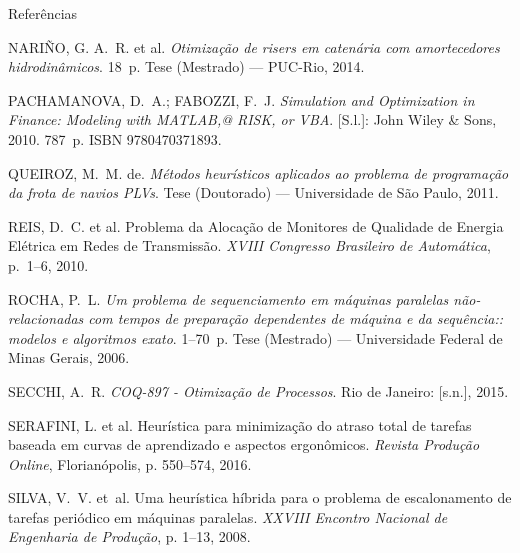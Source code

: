 \documentclass[]{beamer}
\begin{document}
\begin{frame}[allowframebreaks]{Referências}
\begin{thebibliography}{9}
		{NARI{\~{N}}O, G. A.~R. et al.
		\emph{{Otimiza{\c{c}}{\~{a}}o de risers em caten{\'{a}}ria com amortecedores
		  hidrodin{\^{a}}micos}}.
		18~p. Tese (Mestrado) --- PUC-Rio, 2014.}
		
		{PACHAMANOVA, D.~A.; FABOZZI, F.~J. \emph{{Simulation and Optimization in
		  Finance: Modeling with MATLAB,@ RISK, or VBA}}. [S.l.]: John Wiley {\&} Sons,
		  2010. 787~p.
		ISBN 9780470371893.}
		
		{QUEIROZ, M.~M. de.
		\emph{{M{\'{e}}todos heur{\'{i}}sticos aplicados ao problema de
		  programa{\c{c}}{\~{a}}o da frota de navios PLVs}}.
		Tese (Doutorado) --- Universidade de S{\~{a}}o Paulo, 2011.}
		
		{REIS, D.~C. et al. {Problema da Aloca{\c{c}}{\~{a}}o de Monitores de Qualidade
		  de Energia El{\'{e}}trica em Redes de Transmiss{\~{a}}o}.
		\emph{XVIII Congresso Brasileiro de Autom{\'{a}}tica}, p.~1--6, 2010.}
		
		{ROCHA, P.~L.
		\emph{{Um problema de sequenciamento em m{\'{a}}quinas paralelas
		  n{\~{a}}o-relacionadas com tempos de prepara{\c{c}}{\~{a}}o dependentes de
		  m{\'{a}}quina e da sequ{\^{e}}ncia:: modelos e algoritmos exato}}.
		1--70~p. Tese (Mestrado) --- Universidade Federal de Minas Gerais, 2006.}
		
		{SECCHI, A.~R. \emph{{COQ-897 - Otimiza{\c{c}}{\~{a}}o de Processos}}. Rio de
		  Janeiro: [s.n.], 2015.}
		
		{SERAFINI, L. et al. {Heur{\'{i}}stica para minimiza{\c{c}}{\~{a}}o do atraso
		  total de tarefas baseada em curvas de aprendizado e aspectos
		  ergon{\^{o}}micos}.
		\emph{Revista Produ{\c{c}}{\~{a}}o Online}, Florian{\'{o}}polis, p. 550--574,
		  2016.}
		
		{SILVA, V.~V. et~al. {Uma heur{\'{i}}stica h{\'{i}}brida para o problema de
		  escalonamento de tarefas peri{\'{o}}dico em m{\'{a}}quinas paralelas}.
		\emph{XXVIII Encontro Nacional de Engenharia de Produ{\c{c}}{\~{a}}o}, p.
		  1--13, 2008.}
		

\end{thebibliography}
\end{frame}
\end{document}
